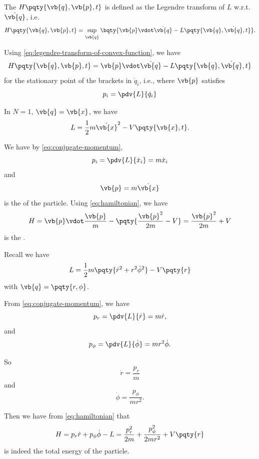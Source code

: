 \begin{definition}[Hamiltonian]
    The  \(H \pqty{\vb{q}, \vb{p}, t}\) is defined as the Legendre transform of \(L\) w.r.t. \(\dot{\vb{q}}\), i.e.
    \begin{equation}
        \label{eq:hamiltonian}%
        H \pqty{\vb{q}, \vb{p}, t} = \sup_{\dot{\vb{q}}} \bqty{\vb{p} \vdot \dot{\vb{q}} - L \pqty{\vb{q}, \dot{\vb{q}}, t}}.
    \end{equation}
\end{definition}

Using \eqref{eq:legendre-transform-of-convex-function}, we have
\[
    H\pqty{\vb{q}, \vb{p}, t} = \vb{p} \vdot \dot{\vb{q}} - L\pqty{\vb{q}, \dot{\vb{q}}, t}
\]
for the stationary point of the brackets in \(\dot{q}_i\), i.e., where \(\vb{p}\) satisfies
\begin{equation}
    \label{eq:conjugate-momentum}%
    p_i = \pdv{L}{\dot{q}_i}
\end{equation}

\begin{example}
    In \(N = 1\), \(\vb{q} = \vb{x}\), we have
    \[
        L = \frac{1}{2} m \dot{\vb{x}}^2 - V \pqty{\vb{x}, t}.
    \]

    We have by \eqref{eq:conjugate-momentum},
    \[
        p_i = \pdv{L}{\dot{x}_i} = m \dot{x}_i
    \]
    and
    \[
        \vb{p} = m \dot{\vb{x}}
    \]
    is the  of the particle. Using \eqref{eq:hamiltonian}, we have
    \[
        H = \vb{p} \vdot \frac{\vb{p}}{m} - \pqty{\frac{\vb{p}^2}{2m} - V} = \frac{\vb{p}^2}{2m} + V
    \]
    is the .
\end{example}

\begin{examples}
    Recall we have
    \[
        L = \frac{1}{2} m \pqty{\dot{r}^2 + r^2 \dot{\phi}^2} - V\pqty{r}
    \]
    with \(\vb{q} = \pqty{r, \phi}\).

    From \eqref{eq:conjugate-momentum}, we have
    \[
        p_r = \pdv{L}{\dot{r}} = m \dot{r},
    \]
    and
    \[
        p_{\phi} = \pdv{L}{\dot{\phi}} = m r^2 \dot{\phi}.
    \]

    So
    \[
        \dot{r} = \frac{p_r}{m}
    \]
    and
    \[
        \dot{\phi} = \frac{p_\phi}{m r^2}.
    \]

    Then we have from \eqref{eq:hamiltonian} that
    \[
        H = p_r \dot{r} + p_\phi \dot{\phi} - L = \frac{p_r^2}{2m} + \frac{p_\phi^2}{2 m r^2} + V\pqty{r}
    \]
    is indeed the total energy of the particle.
\end{examples}

